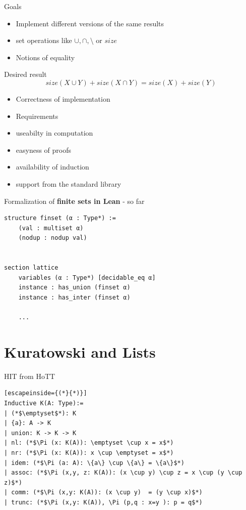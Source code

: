 \documentclass{beamer}
\begin{document}
    \begin{frame}{Goals}
        \begin{itemize}
            \item Implement different versions of the same results
            \item set operations like $\cup, \cap, \setminus$ or $size$
            \item Notions of equality
        \end{itemize}
        Desired result \[size(X \cup Y) + size (X \cap Y) = size(X) + size(Y)\]
        \begin{itemize}
            \item Correctness of implementation
            \item Requirements
            \item useabilty in computation
            \item easyness of proofs
            \item availability of induction
            \item support from the standard library
        \end{itemize}
    
    \end{frame}

    \begin{frame}[fragile]{Formalization of \textbf{finite sets in Lean} - so far}
        \begin{lstlisting}
structure finset (α : Type*) :=
    (val : multiset α)
    (nodup : nodup val)


section lattice
    variables (α : Type*) [decidable_eq α] 
    instance : has_union (finset α) 
    instance : has_inter (finset α)

    ...
        \end{lstlisting}
    \end{frame}
    \section{Kuratowski and Lists}
    \begin{frame}[fragile]{HIT from HoTT}
        \begin{lstlisting}[escapeinside={(*}{*)}]   
Inductive K(A: Type):=
| (*$\emptyset$*): K
| {a}: A -> K
| union: K -> K -> K
| nl: (*$\Pi (x: K(A)): \emptyset \cup x = x$*)
| nr: (*$\Pi (x: K(A)): x \cup \emptyset = x$*)
| idem: (*$\Pi (a: A): \{a\} \cup \{a\} = \{a\}$*)
| assoc: (*$\Pi (x,y, z: K(A)): (x \cup y) \cup z = x \cup (y \cup z)$*)
| comm: (*$\Pi (x,y: K(A)): (x \cup y)  = (y \cup x)$*)
| trunc: (*$\Pi (x,y: K(A)), \Pi (p,q : x=y ): p = q$*)

        \end{lstlisting}
    \end{frame}
\end{document}
